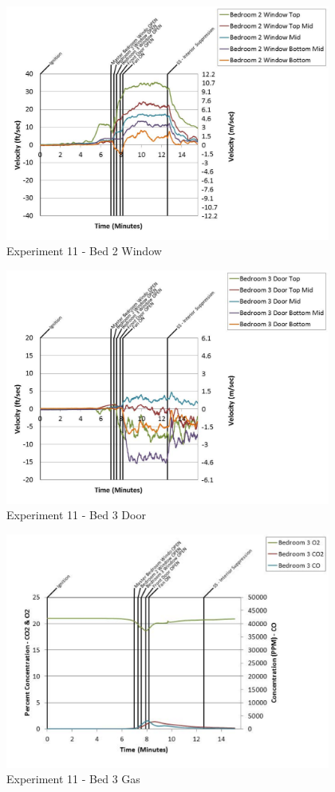 \documentclass{article}
\begin{document}
\begin{appendices}
	\clearpage

	\begin{figure}[h!]
		\centering
		\includegraphics[height=3.05in]{0_Images/Results_Charts/Exp_11_Charts/Bed2Window.pdf}
		\caption{Experiment 11 - Bed 2 Window}
	\end{figure}
 

	\begin{figure}[h!]
		\centering
		\includegraphics[height=3.05in]{0_Images/Results_Charts/Exp_11_Charts/Bed3Door.pdf}
		\caption{Experiment 11 - Bed 3 Door}
	\end{figure}
 
	\clearpage

	\begin{figure}[h!]
		\centering
		\includegraphics[height=3.05in]{0_Images/Results_Charts/Exp_11_Charts/Bed3Gas.pdf}
		\caption{Experiment 11 - Bed 3 Gas}
	\end{figure}
 


\end{appendices}
\end{document}
